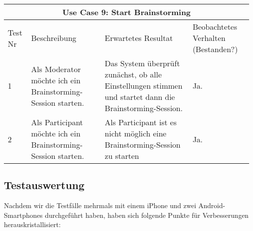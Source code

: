 \renewcommand{\arraystretch}{1.35}
\begin{center}
	\begin{longtable}{| p{1cm} | p{4cm} | p{5cm} | p{3cm} |}
		\hline
		\multicolumn{4}{|c|}{\textbf{Use Case 9: Start Brainstorming}}\\
		\hline\hline
		Test Nr & Beschreibung & Erwartetes Resultat & Beo\-bach\-te\-tes Verhalten (Bestanden?) \\
		\hline
		1 & Als Moderator möchte ich ein Brainstorming-Session starten. & Das System überprüft zunächst, ob alle Einstellungen stimmen und startet dann die Brainstorming-Session. & Ja. \\
		\hline
		2 & Als Participant möchte ich ein Brainstorming-Session starten. & Als Participant ist es nicht möglich eine Brainstorming-Session zu starten & Ja.\\
		\hline
	\end{longtable}
\end{center}

\subsection{Testauswertung}
Nachdem wir die Testfälle mehrmals mit einem iPhone und zwei Android-Smartphones durchgeführt haben, haben sich folgende Punkte für Verbesserungen herauskristallisiert:

